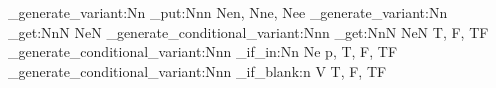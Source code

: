 %
%
%
%

\ExplSyntaxOn

\cs_generate_variant:Nn \prop_put:Nnn { Nen, Nne, Nee }
\cs_generate_variant:Nn \prop_get:NnN { NeN }
\prg_generate_conditional_variant:Nnn \prop_get:NnN { NeN } { T, F, TF }
\prg_generate_conditional_variant:Nnn \prop_if_in:Nn { Ne } { p, T, F, TF }
\prg_generate_conditional_variant:Nnn \tl_if_blank:n { V } { T, F, TF }

